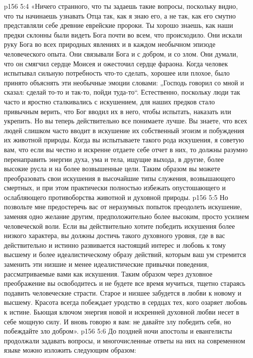 \vs p156 5:4 «Ничего странного, что ты задаешь такие вопросы, поскольку видно, что ты начинаешь узнавать Отца так, как я знаю его, а не так, как его смутно представляли себе древние еврейские пророки. Ты хорошо знаешь, как наши предки склонны были видеть Бога почти во всем, что происходило. Они искали руку Бога во всех природных явлениях и в каждом необычном эпизоде человеческого опыта. Они связывали Бога и с добром, и со злом. Они думали, что он смягчил сердце Моисея и ожесточил сердце фараона. Когда человек испытывал сильную потребность что\hyp{}то сделать, хорошее или плохое, было принято объяснять эти необычные эмоции словами: „Господь говорил со мной и сказал: сделай то\hyp{}то и так\hyp{}то, пойди туда\hyp{}то“. Естественно, поскольку люди так часто и яростно сталкивались с искушением, для наших предков стало привычным верить, что Бог вводил их в него, чтобы испытать, наказать или укрепить. Но вы теперь действительно все понимаете лучше. Вы знаете, что всех людей слишком часто вводит в искушение их собственный эгоизм и побуждения их животной природы. Когда вы испытываете такого рода искушения, я советую вам, что если вы честно и искренне отдаете себе отчет в них, то должны разумно перенаправить энергии духа, ума и тела, ищущие выхода, в другие, более высокие русла и на более возвышенные цели. Таким образом вы можете преобразовать свои искушения в высочайшие типы служения, возвышающего смертных, и при этом практически полностью избежать опустошающего и ослабляющего противоборства животной и духовной природы.
\vs p156 5:5 Но позвольте мне предостеречь вас от неразумных попыток преодолеть искушение, заменяя одно желание другим, предположительно более высоким, просто усилием человеческой воли. Если вы действительно хотите победить искушения более низкого характера, вы должны достичь такого духовного уровня, где в вас действительно и истинно развивается настоящий интерес и любовь к тому высшему и более идеалистическому образу действий, которым ваш ум стремится заменить эти низшие и менее идеалистические привычки поведения, рассматриваемые вами как искушения. Таким образом через духовное преображение вы освободитесь и не будете все время мучиться, тщетно стараясь подавить человеческие страсти. Старое и низшее забудется в любви к новому и высшему. Красота всегда побеждает уродство в сердцах тех, кого озаряет любовь к истине. Бьющая ключом энергия новой и искренней духовной любви несет в себе мощную силу. И вновь говорю я вам: не давайте злу победить себя, но побеждайте зло добром».
\vs p156 5:6 До поздней ночи апостолы и евангелисты продолжали задавать вопросы, и многочисленные ответы на них на современном языке можно изложить следующим образом:
